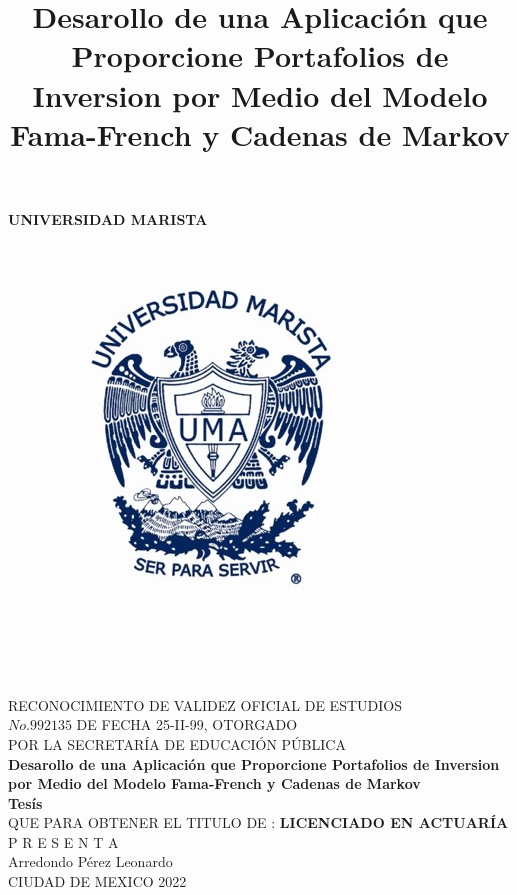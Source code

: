 \documentclass[12pt,a4paper]{article}
\title{Desarollo de una Aplicación que Proporcione Portafolios de Inversion  por Medio  
	del Modelo Fama-French y Cadenas de  Markov}
\begin{document}
	\begin{center}
	\textbf{UNIVERSIDAD MARISTA}
	\begin{figure}[htb]
	\centering
	\includegraphics[scale=1.1]{logo_marista_trabajo_titulacion.jpg}
	\end{figure}\\
	RECONOCIMIENTO DE  VALIDEZ OFICIAL  DE ESTUDIOS\\
	$No. 992135$ DE FECHA 25-II-99, OTORGADO \\
	POR LA SECRETARÍA DE EDUCACIÓN PÚBLICA \\
	\textbf{Desarollo de una Aplicación que Proporcione Portafolios de Inversion  por Medio  
	del Modelo Fama-French y Cadenas de  Markov}\\
	\textbf{Tesís}\\
	QUE PARA OBTENER EL TITULO DE : \textbf{LICENCIADO EN ACTUARÍA}\\
	P R E S E N T A\\
	Arredondo Pérez Leonardo\\
	CIUDAD DE MEXICO 2022\\
	\end{center}
\newpage
\tableofcontents
\newpage
\listoffigures
{}
\newpage
\listoftables
{}
\newpage
\end{document}

